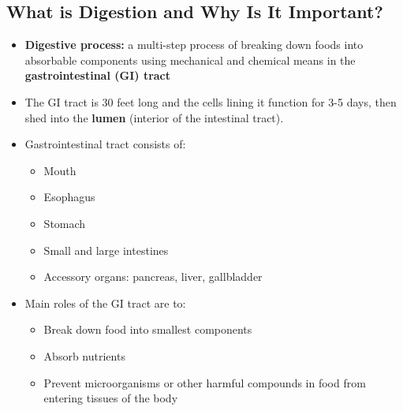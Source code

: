 \documentclass[12pt]{article}
\begin{document}
        \subsection{What is Digestion and Why Is It Important?}
            \begin{itemize}
                \item \textbf{Digestive process:} a multi-step process of breaking down foods into absorbable components using mechanical and chemical means in the \textbf{gastrointestinal (GI) tract}
                \item The GI tract is 30 feet long and the cells lining it function for 3-5 days, then shed into the \textbf{lumen} (interior of the intestinal tract).
                \item Gastrointestinal tract consists of:
                    \begin{itemize}
                        \item Mouth
                        \item Esophagus
                        \item Stomach
                        \item Small and large intestines
                        \item Accessory organs: pancreas, liver, gallbladder
                    \end{itemize}
                \item Main roles of the GI tract are to:
                    \begin{itemize}
                        \item Break down food into smallest components
                        \item Absorb nutrients
                        \item Prevent microorganisms or other harmful compounds in food from entering tissues of the body
                    \end{itemize}
            \end{itemize}
        
\end{document}
